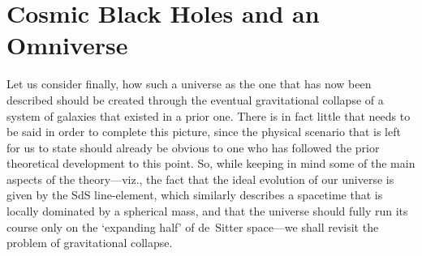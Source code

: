 {\section{Cosmic Black Holes and an Omniverse\label{sec_CBHO}}
Let us consider finally, how such a universe as the one that has now been described should be created through the eventual gravitational collapse of a system of galaxies that existed in a prior one. There is in fact little that needs to be said in order to complete this picture, since the physical scenario that is left for us to state should already be obvious to one who has followed the prior theoretical development to this point. So, while keeping in mind some of the main aspects of the theory---viz., the fact that the ideal evolution of our universe is given by the SdS line-element, which similarly describes a spacetime that is locally dominated by a spherical mass, and that the universe should fully run its course only on the `expanding half' of de~Sitter space---we shall revisit the problem of gravitational collapse.


}
